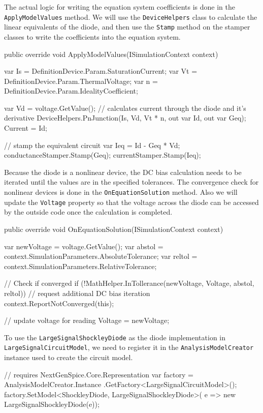 The actual logic for writing the equation system coefficients is done in the \texttt{ApplyModelValues} method. We will use the \texttt{DeviceHelpers} class to calculate the linear equivalents of the diode, and then use the \texttt{Stamp} method on the stamper classes to write the coefficients into the equation system.

\begin{csharpcode}
	public override void ApplyModelValues(ISimulationContext context)
	{
		var Is = DefinitionDevice.Param.SaturationCurrent;
		var Vt = DefinitionDevice.Param.ThermalVoltage;
		var n = DefinitionDevice.Param.IdealityCoefficient;
		
		var Vd = voltage.GetValue();
		// calculates current through the diode and it's derivative
		DeviceHelpers.PnJunction(Is, Vd, Vt * n, out var Id, out var Geq);
		Current = Id; 
		
		// stamp the equivalent circuit
		var Ieq = Id - Geq * Vd;
		conductanceStamper.Stamp(Geq);
		currentStamper.Stamp(Ieq);
	}
\end{csharpcode}

Because the diode is a nonlinear device, the DC bias calculation needs to be iterated until the values are in the specified tolerances. The convergence check for nonlinear devices is done in the \texttt{OnEquationSolution} method. Also we will update the \texttt{Voltage} property so that the voltage across the diode can be accessed by the outside code once the calculation is completed.

\begin{csharpcode}
	public override void OnEquationSolution(ISimulationContext context)
	{   
		var newVoltage = voltage.GetValue();
		var abstol = context.SimulationParameters.AbsoluteTolerance;
		var reltol = context.SimulationParameters.RelativeTolerance;
		
		// Check if converged
		if (!MathHelper.InTollerance(newVoltage, Voltage, abstol, reltol))
		{
			// request additional DC bias iteration
			context.ReportNotConverged(this);
		}
		
		// update voltage for reading
		Voltage = newVoltage;
	}
\end{csharpcode}

 To use the \texttt{LargeSignalShockleyDiode} as the diode implementation in \texttt{Large\+SignalCircuitModel}, we need to register it in the \texttt{Analysis\+ModelCreator} instance used to create the circuit model.


\begin{csharpcode}
	// requires NextGenSpice.Core.Representation
	var factory = AnalysisModelCreator.Instance
		.GetFactory<LargeSignalCircuitModel>();
	factory.SetModel<ShockleyDiode, LargeSignalShockleyDiode>(
		e => new LargeSignalShockleyDiode(e));
\end{csharpcode}

